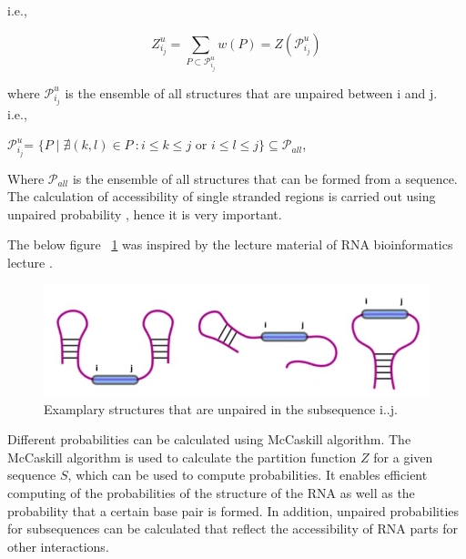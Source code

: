 \documentclass[twoside,a4paper]{report}
\begin{document}
 	 i.e., 
 	 \begin{center}	 
 	 	\[ 
 	 	Z^u_{i_j}= \sum_{P \subset \mathcal{P}^u_{i_j}} w(P) = Z(\mathcal{P}^u_{i_j})
 	 	\]
 	 \end{center}
  
  	 where $\mathcal{P}^u_{i_j}$ is the ensemble of all structures that are unpaired between i and j.\\
  	 
  	  i.e., 
  	 \begin{center}	 
  	 
  	 	$\mathcal{P}^u_{i_j}$= $\{P \mid \nexists (k,l) \in P\ : i \leq k \leq j $ or $ i \leq l \leq j\}\subseteq \mathcal {P}_{all}$,
  	 
  	 \end{center}
  	 
  	 Where $\mathcal {P}_{all}$ is the ensemble of all structures that can be formed from a sequence. The calculation of accessibility of single stranded regions is carried out using  unpaired probability \citep{muckstein2006thermodynamics}, hence it is very important. 
  
 	 The below figure ~\ref{fig:unpaired} was inspired by the lecture material of RNA bioinformatics lecture .\\
 	 
 	 \begin{figure}[H]
 	 	\includegraphics[width=0.8\linewidth]{unpaired}
 	 	\centering
 	 	\caption{Examplary structures that are unpaired in the subsequence i..j.}
 	 	\label{fig:unpaired}
 	 \end{figure}
  
 	 Different probabilities can be calculated using McCaskill algorithm. The McCaskill algorithm \citep{mccaskill1990equilibrium} is used to calculate the partition function $Z$ for a given sequence $S$, which can be used to compute probabilities. It enables efficient computing of the probabilities of the structure of the RNA as well as the probability that a certain base pair is formed. In addition, unpaired probabilities for subsequences can be calculated that reflect the accessibility of RNA parts for other interactions.\\ 
 	
\end{document}
